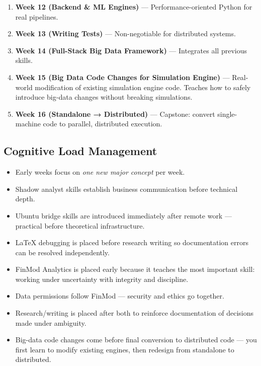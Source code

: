 \documentclass[12pt]{article}
\begin{document}
\begin{enumerate}
		\item \textbf{Week 12 (Backend \& ML Engines)} — Performance-oriented Python for real pipelines.
		
		\item \textbf{Week 13 (Writing Tests)} — Non-negotiable for distributed systems.
		
		\item \textbf{Week 14 (Full-Stack Big Data Framework)} — Integrates all previous skills.
		
		\item \textbf{Week 15 (Big Data Code Changes for Simulation Engine)} — Real-world modification of existing simulation engine code. Teaches how to safely introduce big-data changes without breaking simulations.
		
		\item \textbf{Week 16 (Standalone → Distributed)} — Capstone: convert single-machine code to parallel, distributed execution.
	\end{enumerate}
	
	\subsection*{Cognitive Load Management}
	\begin{itemize}
		\item Early weeks focus on \emph{one new major concept} per week.
		\item Shadow analyst skills establish business communication before technical depth.
		\item Ubuntu bridge skills are introduced immediately after remote work — practical before theoretical infrastructure.
		\item LaTeX debugging is placed before research writing so documentation errors can be resolved independently.
		\item FinMod Analytics is placed early because it teaches the most important skill: working under uncertainty with integrity and discipline.
		\item Data permissions follow FinMod — security and ethics go together.
		\item Research/writing is placed after both to reinforce documentation of decisions made under ambiguity.
		\item Big-data code changes come before final conversion to distributed code — you first learn to modify existing engines, then redesign from standalone to distributed.
	\end{itemize}
	
\end{document}
